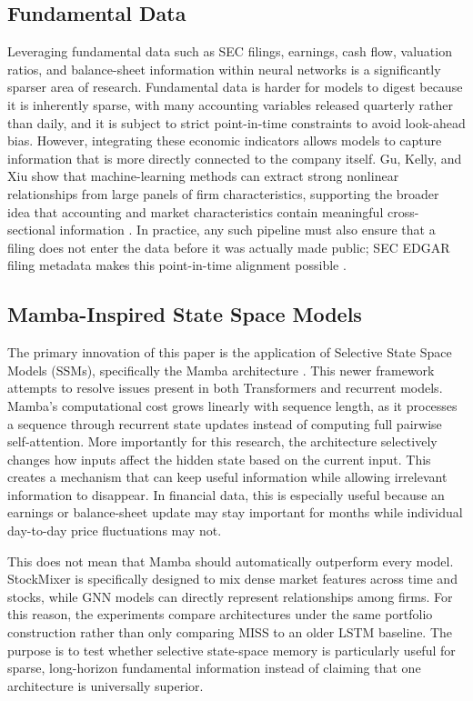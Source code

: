\documentclass[11pt,twocolumn]{article}
\begin{document}
\subsection{Fundamental Data}

Leveraging fundamental data such as SEC filings, earnings, cash flow,
valuation ratios, and balance-sheet information within neural networks is
a significantly sparser area of research. Fundamental data is harder for
models to digest because it is inherently sparse, with many accounting
variables released quarterly rather than daily, and it is subject to
strict point-in-time constraints to avoid look-ahead bias. However,
integrating these economic indicators allows models to capture
information that is more directly connected to the company itself. Gu,
Kelly, and Xiu show that machine-learning methods can extract strong
nonlinear relationships from large panels of firm characteristics,
supporting the broader idea that accounting and market characteristics
contain meaningful cross-sectional information \cite{gkx2020}. In
practice, any such pipeline must also ensure that a filing does not enter
the data before it was actually made public; SEC EDGAR filing metadata
makes this point-in-time alignment possible \cite{sec2025}.

\subsection{Mamba-Inspired State Space Models}

The primary innovation of this paper is the application of Selective
State Space Models (SSMs), specifically the Mamba architecture
\cite{gu2023}. This newer framework attempts to resolve issues present in
both Transformers and recurrent models. Mamba's computational cost grows
linearly with sequence length, as it processes a sequence through
recurrent state updates instead of computing full pairwise
self-attention. More importantly for this research, the architecture
selectively changes how inputs affect the hidden state based on the
current input. This creates a mechanism that can keep useful information
while allowing irrelevant information to disappear. In financial data,
this is especially useful because an earnings or balance-sheet update may
stay important for months while individual day-to-day price fluctuations
may not.

This does not mean that Mamba should automatically outperform every
model. StockMixer is specifically designed to mix dense market features
across time and stocks, while GNN models can directly represent
relationships among firms. For this reason, the experiments compare
architectures under the same portfolio construction rather than only
comparing MISS to an older LSTM baseline. The purpose is to test whether
selective state-space memory is particularly useful for sparse,
long-horizon fundamental information instead of claiming that one
architecture is universally superior.
\end{document}
